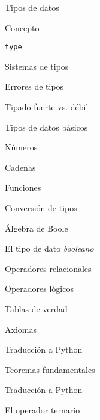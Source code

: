 \begin{longenum}
\begin{longenum}
\begin{longenum}
        \end{longenum}
        \item Tipos de datos
        \begin{longenum}
            \item Concepto
            \item \texttt{type}
            \item Sistemas de tipos
            \begin{longenum}
                \item Errores de tipos
                \item Tipado fuerte vs. débil
            \end{longenum}
            \item Tipos de datos básicos
            \begin{longenum}
                \item Números
                \item Cadenas
                \item Funciones
            \end{longenum}
            \item Conversión de tipos
        \end{longenum}
        \item Álgebra de Boole
        \begin{longenum}
            \item El tipo de dato \textit{booleano}
            \item Operadores relacionales
            \item Operadores lógicos
            \begin{longenum}
                \item Tablas de verdad
            \end{longenum}
            \item Axiomas
            \begin{longenum}
                \item Traducción a Python
            \end{longenum}
            \item Teoremas fundamentales
            \begin{longenum}
                \item Traducción a Python
            \end{longenum}
            \item El operador ternario
        \end{longenum}

\end{longenum}
\end{longenum}
